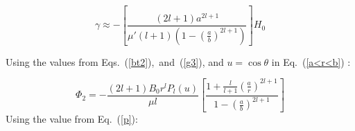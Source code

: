 \begin{equation}\label{g3}
\gamma\approx-\left[\frac{(2l+1)a^{2l+1}}{\mu'(l+1)\left(1-\left(\frac{a}{b}\right)^{2l+1}\right)}\right] H_0
\end{equation}


Using the values from Eqs.~(\ref{bt2}),~and~(\ref{g3}), and $u=\cos\theta$ in Eq.~(\ref{a<r<b}) :



\begin{equation}\label{p}
\Phi_2=-\frac{(2l+1)B_0r^lP_l(u)}{\mu l}\left[\frac{1+\frac{l}{l+1}\left(\frac{a}{r}\right)^{2l+1}}{1-\left(\frac{a}{b}\right)^{2l+1}}\right]
\end{equation}
Using the value from Eq.~(\ref{p}):
